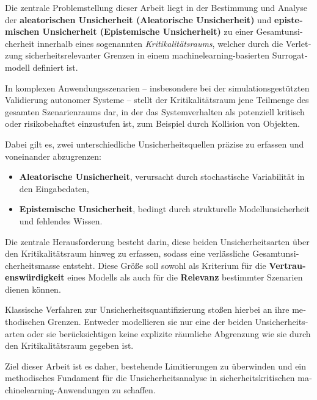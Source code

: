 \begin{otherlanguage}{ngerman}
Die zentrale Problemstellung dieser Arbeit liegt in der Bestimmung und Analyse der \textbf{aleatorischen Unsicherheit (\gls{Aleatorische Unsicherheit})} und \textbf{epistemischen Unsicherheit (\gls{Epistemische Unsicherheit})} zu einer Gesamtunsicherheit innerhalb eines sogenannten \emph{Kritikalitätsraums}, welcher durch die Verletzung sicherheitsrelevanter Grenzen in einem \gls{machinelearning}-basierten Surrogatmodell definiert ist.\newline

In komplexen Anwendungsszenarien – insbesondere bei der simulationsgestützten Validierung autonomer Systeme – stellt der Kritikalitätsraum jene Teilmenge des gesamten Szenarienraums dar, in der das Systemverhalten als potenziell kritisch oder risikobehaftet einzustufen ist, zum Beispiel durch Kollision von Objekten.\newline

Dabei gilt es, zwei unterschiedliche Unsicherheitsquellen präzise zu erfassen und voneinander abzugrenzen:

\begin{itemize}
  \item \textbf{\gls{Aleatorische Unsicherheit}}, verursacht durch stochastische Variabilität in den Eingabedaten,
  \item \textbf{\gls{Epistemische Unsicherheit}}, bedingt durch strukturelle Modellunsicherheit und fehlendes Wissen.
\end{itemize}

Die zentrale Herausforderung besteht darin, diese beiden Unsicherheitsarten über den Kritikalitätsraum hinweg zu erfassen, sodass eine verlässliche Gesamtunsicherheitsmasse entsteht. Diese Größe soll sowohl als Kriterium für die \textbf{Vertrauenswürdigkeit} eines Modells als auch für die \textbf{Relevanz} bestimmter Szenarien dienen können.\newline

Klassische Verfahren zur Unsicherheitsquantifizierung stoßen hierbei an ihre methodischen Grenzen. Entweder modellieren sie nur eine der beiden Unsicherheitsarten oder sie berücksichtigen keine explizite räumliche Abgrenzung wie sie durch den Kritikalitätsraum gegeben ist.\newline

Ziel dieser Arbeit ist es daher, bestehende Limitierungen zu überwinden und ein methodisches Fundament für die Unsicherheitsanalyse in sicherheitskritischen \gls{machinelearning}-Anwendungen zu schaffen.
\end{otherlanguage}
